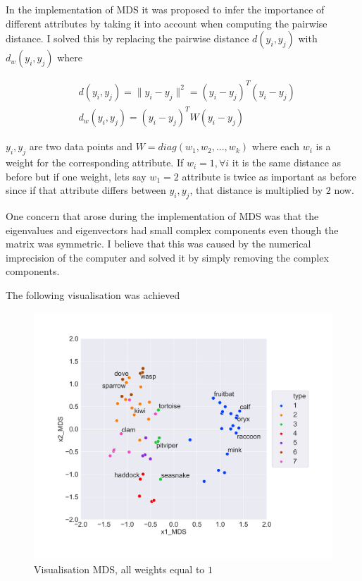 In the implementation of MDS it was proposed to infer the importance of different attributes by taking it into account when computing the pairwise distance. I solved this by replacing the pairwise distance $d(y_i, y_j)$ with $d_w(y_i, y_j)$ where

\begin{align*}
  & d(y_i, y_j) = \|y_i -y_j \|^2 = (y_i-y_j)^T(y_i-y_j)\\
  & d_w(y_i, y_j) = (y_i-y_j)^T W (y_i-y_j)
\end{align*}

 $y_i, y_j$ are two data points and $W = diag(w_1,w_2,..., w_k)$ where each $w_i$ is a weight for the corresponding attribute. If $w_i = 1, \forall i$ it is the same distance as before but if one weight, lets say $w_1 = 2$ attribute is twice as important as before since if that attribute differs between $y_i, y_j$, that distance is multiplied by $2$ now.

One concern that arose during the implementation of MDS was that the eigenvalues and eigenvectors had small complex components even though the matrix was symmetric. I believe that this was caused by the numerical imprecision of the computer and solved it by simply removing the complex components.

The following visualisation was achieved

\begin{figure}[H]
  \centering
  \includegraphics[width = 0.8\linewidth]{../Visualization_MDS_no_weights.png}
  \caption{Visualisation MDS, all weights equal to $1$}
  \label{vis_PCA}
\end{figure}

